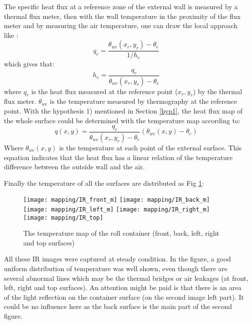 The specific heat flux at a reference zone of the external wall is measured by a thermal flux meter, then with the wall temperature in the proximity of the flux meter and by measuring the air temperature, one can draw the local approach like \citep{rossi2009k}:
\begin{equation}
q_r = \frac{\theta_{we}(x_r,y_r)-\theta_e}{1/h_e}
\end{equation}
which gives that:
\begin{equation}
h_e = \frac{q_r}{\theta_{we}(x_r,y_r)-\theta_e}
\end{equation}
where $q_r$ is the heat flux measured at the reference point ($x_r,y_r$) by the thermal flux meter. $\theta_{we}$ is the temperature measured by thermography at the reference point. With the hypothesis 1) mentioned in Section \ref{hyp1}, the heat flux map of the whole surface could be determined with the temperature map according to:
\begin{equation}
q(x,y) = \frac{q_r}{\theta_{we}(x_r,y_r)-\theta_e}(\theta_{we}(x,y)-\theta_e)
\label{eq_q}
\end{equation}
Where $\theta_{we}(x,y)$ is the temperature at each point of the external surface. This equation indicates that the  heat flux has a linear relation of the temperature difference between the outside wall and the air.

Finally the temperature of all the surfaces are distributed as Fig \ref{IR_box}:
\begin{figure}[!htbp]
	\centering
	\texttt{[image: mapping/IR\_front\_m]}
	\hspace{6pt}
	\texttt{[image: mapping/IR\_back\_m]}
	\vspace{3pt}
	\texttt{[image: mapping/IR\_left\_m]}
	\hspace{6pt}
	\texttt{[image: mapping/IR\_right\_m]}
	\texttt{[image: mapping/IR\_top]}
	\caption{The temperature map of the roll container (front, back, left, right and top surfaces)}
	\label{IR_box}
\end{figure}
All these IR images were captured at steady condition. 
In the figure, a good uniform distribution of temperature was well shown, even though there are several abnormal lines which may be the thermal bridges or air leakages (at front, left, right and top surfaces). An attention might be paid is that there is an area of the light reflection on the container surface (on the second image left part). It could be no influence here as the back surface is the main part of the second figure.

